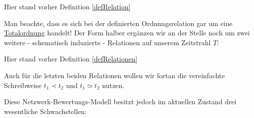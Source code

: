 \vspace{0.3cm}

Hier stand vorher Definition \ref{defRelation}

\vspace{1cm}

Man beachte, dass es sich bei der definierten Ordnungsrelation gar um eine \href{https://de.wikipedia.org/wiki/Ordnungsrelation#Totalordnung}{Totalordnung} handelt!
Der Form halber ergänzen wir an der Stelle noch um zwei weitere - schematisch induzierte - Relationen auf unserem Zeitstrahl $T$:

\vspace{0.3cm}

Hier stand vorher Definition \ref{defRelationen}

\vspace{0.3cm}

Auch für die letzten beiden Relationen wollen wir fortan die vereinfachte Schreibweise $t_1 \prec t_2$ und $t_1 \simeq t_2$ nutzen.
























 

\vspace{1cm}

Diese Netzwerk-Bewertungs-Modell besitzt jedoch im aktuellen Zustand drei wesentliche Schwachstellen:

